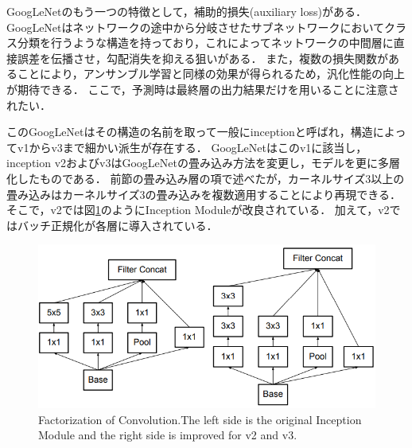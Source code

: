     GoogLeNetのもう一つの特徴として，補助的損失(auxiliary loss)がある．
    GoogLeNetはネットワークの途中から分岐させたサブネットワークにおいてクラス分類を行うような構造を持っており，これによってネットワークの中間層に直接誤差を伝播させ，勾配消失を抑える狙いがある．
    また，複数の損失関数があることにより，アンサンブル学習と同様の効果が得られるため，汎化性能の向上が期待できる．
    ここで，予測時は最終層の出力結果だけを用いることに注意されたい．
    
    このGoogLeNetはその構造の名前を取って一般にinceptionと呼ばれ，構造によってv1からv3まで細かい派生が存在する．
    GoogLeNetはこのv1に該当し，inception v2およびv3はGoogLeNetの畳み込み方法を変更し，モデルを更に多層化したものである．
    前節の畳み込み層の項で述べたが，カーネルサイズ3以上の畳み込みはカーネルサイズ3の畳み込みを複数適用することにより再現できる．
    そこで，v2では図\ref{convFactorization}のようにInception Moduleが改良されている．
    加えて，v2ではバッチ正規化が各層に導入されている．
    \begin{figure}[ht]
      \centering
      \includegraphics[width=12cm]{8_appendix/img/convFactorization}
      \caption{Factorization of Convolution.The left side is the original Inception Module and the right side is improved for v2 and v3.}
      \label{convFactorization}
    \end{figure}
    
